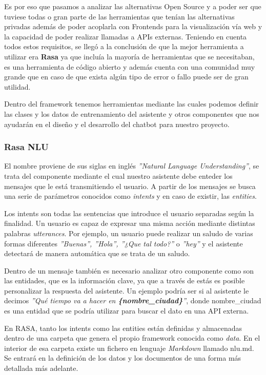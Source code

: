 Es por eso que pasamos a analizar las alternativas Open Source y a poder ser que tuviese todas o gran parte de las herramientas que tenían las alternativas privadas además de poder acoplarla con Frontends para la visualización vía web y la capacidad de poder realizar llamadas a APIs externas. Teniendo en cuenta todos estos requisitos, se llegó a la conclusión de que la mejor herramienta a utilizar era \textbf{Rasa} ya que incluía la mayoría de herramientas que se necesitaban, es una herramienta de código abierto y además cuenta con una comunidad muy grande que en caso de que exista algún tipo de error o fallo puede ser de gran utilidad.

Dentro del framework tenemos herramientas mediante las cuales podemos definir las clases y los datos de entrenamiento del asistente y otros componentes que nos ayudarán en el diseño y el desarrollo del chatbot para nuestro proyecto. 

\subsubsection{Rasa NLU}
El nombre proviene de sus siglas en inglés \textit{''Natural Language Understanding''}, se trata del componente mediante el cual nuestro asistente debe enteder los mensajes que le está transmitiendo el usuario. A partir de los mensajes se busca una serie de parámetros conocidos como \textit{intents} y en caso de existir, las \textit{entities}.

Los intents son todas las sentencias que introduce el usuario separadas según la finalidad. Un usuario es capaz de expresar una misma acción mediante distintas palabras \textit{utterances}. Por ejemplo, un usuario puede realizar un saludo de varias formas diferentes \textit{''Buenas'', ''Hola'', ''¿Que tal todo?''} o \textit{''hey''} y el asistente detectará de manera automática que se trata de un saludo.

Dentro de un mensaje también es necesario analizar otro componente como son las entidades, que es la información clave, ya que a través de estás es posible personalizar la respuesta del asistente. Un ejemplo podría ser si al asistente le decimos \textit{''Qué tiempo va a hacer en \textbf{\{nombre\_ciudad\}}''}, donde nombre\_ciudad es una entidad que se podría utilizar para buscar el dato en una API externa. 

En RASA, tanto los intents como las entities están definidas y almacenadas dentro de una carpeta que genera el propio framework conocida como \textit{data}. En el interior de esa carpeta existe un fichero en lenguaje \textit{Markdown} llamado nlu.md. Se entrará en la definición de los datos y los documentos de una forma más detallada más adelante. 

